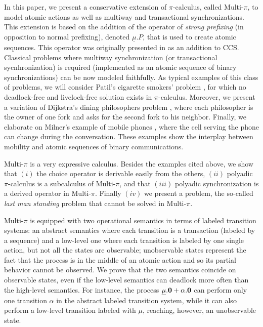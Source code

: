 \documentclass[submission,copyright,creativecommons]{eptcs}
\newcommand{\nil}{\mbox{\bf 0}}
\begin{document}
In this paper, we present a conservative extension of $\pi$-calculus, called Multi-$\pi$,  
to model atomic actions as well as multiway  and transactional synchronizations. 
This extension is based on the addition of the  operator of {\em strong prefixing} 
(in opposition to normal prefixing),  denoted $\underline{\mu}.P$, that is used to create atomic sequences.
This operator was originally presented in \cite{GMM,GM90} as an addition to CCS. 
Classical problems where multiway synchronization (or transactional sycnhronization) is required (implemented 
as an atomic sequence of binary synchronizations) can be now modeled faithfully. 
As typical examples of this class of problems, we will consider Patil's cigarette smokers' problem \cite{Pat71},  
for which no deadlock-free and livelock-free solution exists in $\pi$-calculus. 
Moreover, we present a variation of Dijkstra's dining philosophers problem \cite{Dij68}, where each philosopher 
is the owner of one fork and asks for the second fork to his neighbor. Finally, we elaborate on Milner's
example of mobile phones \cite{Mil91}, where the cell serving the phone can change
during the conversation. These examples show the interplay between mobility and atomic sequences of 
binary communications.

Multi-$\pi$ is a very expressive calculus. Besides the examples cited above, we show that
$(i)$ the choice operator is derivable easily from the others, 
$(ii)$ polyadic $\pi$-calculus \cite{Mil91,Mil99} 
is a subcalculus of Multi-$\pi$, and that $(iii)$ polyadic synchronization \cite{CM03} is a derived operator in Multi-$\pi$.
Finally $(iv)$ we present a problem, the so-called {\em last man standing} problem \cite{VBG09} that cannot 
be solved in Multi-$\pi$.

Multi-$\pi$ is equipped with two operational semantics in terms of labeled transition systems: 
an abstract semantics where each transition is a transaction (labeled by a sequence) 
and a low-level one where each transition is labeled by one single action, but not all the states are observable; 
unobservable states represent the fact that the process is in the middle of an atomic action and so its partial
behavior cannot be observed.
We prove that the two semantics coincide on observable states, even if the low-level semantics can deadlock 
more often than the high-level semantics. For instance, the process $\underline\mu.\nil + \alpha.\nil$ 
can perform only
one transition $\alpha$ in the abstract labeled transition system, while it can also perform a low-level transition
labeled with $\mu$, reaching, however, an unobservable state.
\end{document}
